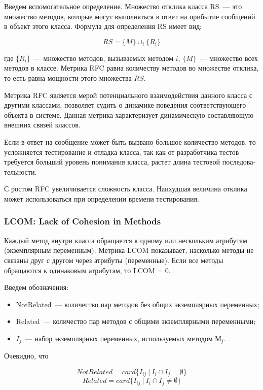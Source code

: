 \documentclass{../../text-style}
\begin{document}
Введем вспомогательное определение. Множество отклика класса RS~--- это множе­ство методов, которые могут выполняться в ответ на прибытие сообщений в объект этого класса. Формула для определения RS имеет вид:

$$RS = \{M\} \cup_{i} \{R_i\}$$

где $\{R_i\}$~--- множество методов, вызываемых методом $i$, $\{M\}$~--- множество всех методов в классе. Метрика RFC равна количеству методов во множестве отклика, то есть равна мощности этого множества $RS$.

Метрика RFC является мерой потенциального взаимодействия данного класса с другими классами, позволяет судить о динамике поведения соответствующего объекта в системе. Данная метрика характеризует динамическую составляющую внешних связей классов.

Если в ответ на сообщение может быть вызвано большое количество методов, то усложняется тестирование и отладка класса, так как от разработчика тестов требуется больший уровень понимания класса, растет длина тестовой последова­тельности.

С ростом RFC увеличивается сложность класса. Наихудшая величина отклика может использоваться при определении времени тестирования.

\subsubsection{LCOM: Lack of Cohesion in Methods}

Каждый метод внутри класса обращается к одному или нескольким атрибутам (экземплярным переменным). Метрика LCOM показывает, насколько методы не связаны друг с другом через атрибуты (переменные). Если все методы обращаются к одинаковым атрибутам, то LCOM = 0.

Введем обозначения:

\begin{itemize}
    \item NotRelated~--- количество пар методов без общих экземплярных переменных;
    \item Related~--- количество пар методов с общими экземплярными переменными;
    \item $I_j$~--- набор экземплярных переменных, используемых методом $М_j$.
\end{itemize}

Очевидно, что

$$NotRelated = card\{I_{ij}\ |\ I_i \cap I_j = \emptyset\}$$
$$Related = card\{I_{ij}\ |\ I_i \cap I_j \neq \emptyset\}$$
\end{document}
